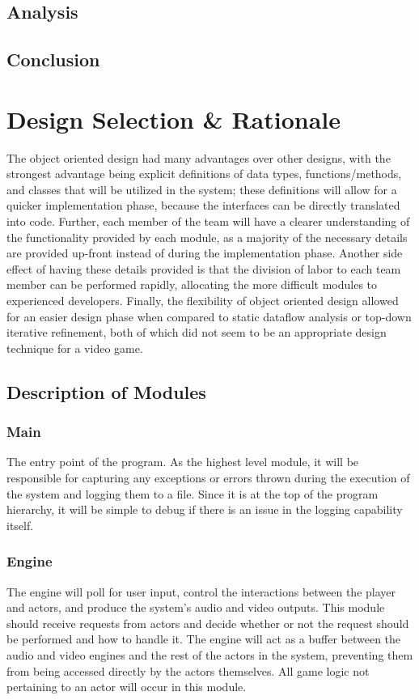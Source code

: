 \documentclass{article}
\begin{document}
	\subsection{Analysis}
	\subsection{Conclusion}
%
%
\section{Design Selection \& Rationale}
The object oriented design had many advantages over other designs, with the strongest advantage being explicit definitions of data types, functions/methods, and classes that will be utilized in the system; these definitions will allow for a quicker implementation phase, because the interfaces can be directly translated into code. Further, each member of the team will have a clearer understanding of the functionality provided by each module, as a majority of the necessary details are provided up-front instead of during the implementation phase. Another side effect of having these details provided is that the division of labor to each team member can be performed rapidly, allocating the more difficult modules to experienced developers. Finally, the flexibility of object oriented design allowed for an easier design phase when compared to static dataflow analysis or top-down iterative refinement, both of which did not seem to be an appropriate design technique for a video game.

  \subsection{Description of Modules}
    \subsubsection{Main}
      The entry point of the program. As the highest level module, it will be responsible for capturing any exceptions or errors thrown during the execution of the system and logging them to a file. Since it is at the top of the program hierarchy, it will be simple to debug if there is an issue in the logging capability itself.
    \subsubsection{Engine}
      The engine will poll for user input, control the interactions between the player and actors, and produce the system's audio and video outputs. This module should receive requests from actors and decide whether or not the request should be performed and how to handle it. The engine will act as a buffer between the audio and video engines and the rest of the actors in the system, preventing them from being accessed directly by the actors themselves. All game logic not pertaining to an actor will occur in this module.
\end{document}
